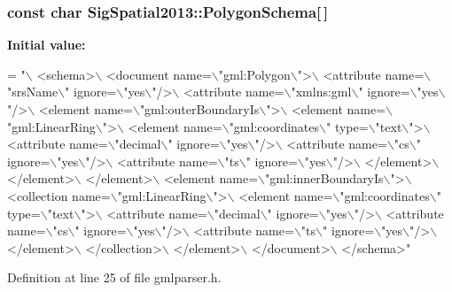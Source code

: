 \hypertarget{namespaceSigSpatial2013_ad5f605834dcd0b8d7262e7fdc75215f9}{
\subsubsection[{Polygon\-Schema}]{\setlength{\rightskip}{0pt plus 5cm}const char Sig\-Spatial2013\-::\-Polygon\-Schema\mbox{[}$\,$\mbox{]}}}\label{namespaceSigSpatial2013_ad5f605834dcd0b8d7262e7fdc75215f9}
{\bfseries Initial value\-:}
\begin{DoxyCode}
= \textcolor{stringliteral}{"\(\backslash\)}
\textcolor{stringliteral}{<schema>\(\backslash\)}
\textcolor{stringliteral}{  <document name=\(\backslash\)"gml:Polygon\(\backslash\)">\(\backslash\)}
\textcolor{stringliteral}{    <attribute name=\(\backslash\)"srsName\(\backslash\)" ignore=\(\backslash\)"yes\(\backslash\)"/>\(\backslash\)}
\textcolor{stringliteral}{    <attribute name=\(\backslash\)"xmlns:gml\(\backslash\)" ignore=\(\backslash\)"yes\(\backslash\)"/>\(\backslash\)}
\textcolor{stringliteral}{    <element name=\(\backslash\)"gml:outerBoundaryIs\(\backslash\)">\(\backslash\)}
\textcolor{stringliteral}{      <element name=\(\backslash\)"gml:LinearRing\(\backslash\)">\(\backslash\)}
\textcolor{stringliteral}{        <element name=\(\backslash\)"gml:coordinates\(\backslash\)" type=\(\backslash\)"text\(\backslash\)">\(\backslash\)}
\textcolor{stringliteral}{          <attribute name=\(\backslash\)"decimal\(\backslash\)" ignore=\(\backslash\)"yes\(\backslash\)"/>\(\backslash\)}
\textcolor{stringliteral}{          <attribute name=\(\backslash\)"cs\(\backslash\)" ignore=\(\backslash\)"yes\(\backslash\)"/>\(\backslash\)}
\textcolor{stringliteral}{          <attribute name=\(\backslash\)"ts\(\backslash\)" ignore=\(\backslash\)"yes\(\backslash\)"/>\(\backslash\)}
\textcolor{stringliteral}{        </element>\(\backslash\)}
\textcolor{stringliteral}{      </element>\(\backslash\)}
\textcolor{stringliteral}{    </element>\(\backslash\)}
\textcolor{stringliteral}{    <element name=\(\backslash\)"gml:innerBoundaryIs\(\backslash\)">\(\backslash\)}
\textcolor{stringliteral}{      <collection name=\(\backslash\)"gml:LinearRing\(\backslash\)">\(\backslash\)}
\textcolor{stringliteral}{        <element name=\(\backslash\)"gml:coordinates\(\backslash\)" type=\(\backslash\)"text\(\backslash\)">\(\backslash\)}
\textcolor{stringliteral}{          <attribute name=\(\backslash\)"decimal\(\backslash\)" ignore=\(\backslash\)"yes\(\backslash\)"/>\(\backslash\)}
\textcolor{stringliteral}{          <attribute name=\(\backslash\)"cs\(\backslash\)" ignore=\(\backslash\)"yes\(\backslash\)"/>\(\backslash\)}
\textcolor{stringliteral}{          <attribute name=\(\backslash\)"ts\(\backslash\)" ignore=\(\backslash\)"yes\(\backslash\)"/>\(\backslash\)}
\textcolor{stringliteral}{        </element>\(\backslash\)}
\textcolor{stringliteral}{      </collection>\(\backslash\)}
\textcolor{stringliteral}{    </element>\(\backslash\)}
\textcolor{stringliteral}{  </document>\(\backslash\)}
\textcolor{stringliteral}{</schema>"}
\end{DoxyCode}


Definition at line 25 of file gmlparser.\-h.

